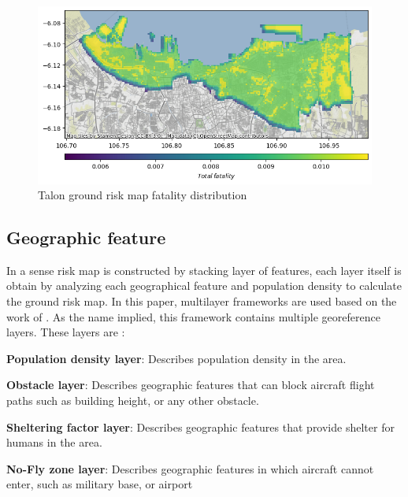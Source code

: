 \documentclass[12pt]{report}
\begin{document}
        \begin{figure}[H]
            \centering
            \includegraphics[width=\textwidth]{Plot/talon/total_fatality.png}
            \caption{Talon ground risk map fatality distribution}
            \label{fig:riskmap}
        \end{figure}

        \subsection{Geographic feature}
            In a sense risk map is constructed by stacking layer of features, each layer itself is obtain by analyzing
            each geographical feature and population density to calculate the ground risk map. In this paper, multilayer
            frameworks are used based on the work of \cite{primatesta_ground_2020}. As the name implied, this framework contains multiple
            georeference layers. These layers are :
                \begin{myitemize}
                    \item \textbf{Population density layer}: Describes population density in the area.
                    \item \textbf{Obstacle layer}: Describes geographic features that can block aircraft flight paths
                    such as building height, or any other obstacle.
                    \item \textbf{Sheltering factor layer}: Describes geographic features that provide shelter for
                    humans in the area.
                    \item \textbf{No-Fly zone layer}: Describes geographic features in which aircraft cannot enter, such
                    as military base, or airport
                \end{myitemize}
\end{document}
